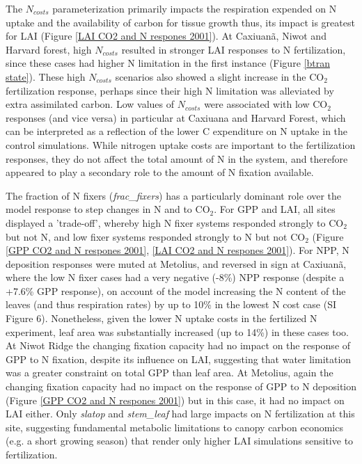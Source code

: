 \usepackage{}\documentclass[draft,linenumbers]{agujournal}
\begin{document}
The $N_{costs}$ parameterization primarily impacts the respiration expended on N uptake and the availability of carbon for tissue growth thus, its impact is greatest for LAI (Figure \ref{LAI CO2 and N respones 2001}). At Caxiuan\~a, Niwot and Harvard forest, high  $N_{costs}$ resulted in stronger LAI responses to N fertilization, since these cases had higher N limitation in the first instance (Figure \ref{btran state}).  These high $N_{costs}$ scenarios also showed a slight increase in the CO$_{2}$ fertilization response, perhaps since their high N limitation was alleviated by extra assimilated carbon.   Low values of $N_{costs}$ were associated with low CO$_{2}$ responses (and vice versa) in particular at Caxiuana and Harvard Forest, which can be interpreted as a reflection of the lower C expenditure on N uptake in the control simulations.  While nitrogen uptake costs are important to the fertilization responses, they do not affect the total amount of N in the system, and therefore appeared to play a secondary role to the amount of N fixation available.

The fraction of N fixers (\emph{frac\_fixers}) has a particularly dominant role over the model response to step changes in N and to CO$_{2}$. For GPP and LAI, all sites displayed a 'trade-off', whereby high N fixer systems responded strongly to CO$_{2}$ but not N, and low fixer systems responded strongly to N but not CO$_{2}$ (Figure \ref{GPP CO2 and N respones 2001}, \ref{LAI CO2 and N respones 2001}).  For NPP, N deposition responses were muted at Metolius, and reversed in sign at Caxiuan\~a, where the low N fixer cases had a very negative (-8\%) NPP response (despite a +7.6\% GPP response), on account of the model increasing the N content of the leaves (and thus respiration rates) by up to 10\% in the lowest N cost case (SI Figure 6). Nonetheless, given the lower N uptake costs in the fertilized N experiment, leaf area was substantially increased (up to 14\%) in these cases too.  At Niwot Ridge the changing fixation capacity had no impact on the response of GPP to N fixation, despite its influence on LAI, suggesting that water limitation was a greater constraint on total GPP than leaf area.  At Metolius, again the changing fixation capacity had no impact on the response of GPP to N deposition (Figure \ref{GPP CO2 and N respones 2001}) but in this case, it had no impact on LAI either. Only \emph{slatop} and \emph{stem\_leaf} had large impacts on N fertilization at this site, suggesting fundamental metabolic limitations to canopy carbon economics (e.g. a short growing season) that render only higher LAI simulations sensitive to fertilization. 
\end{document}
